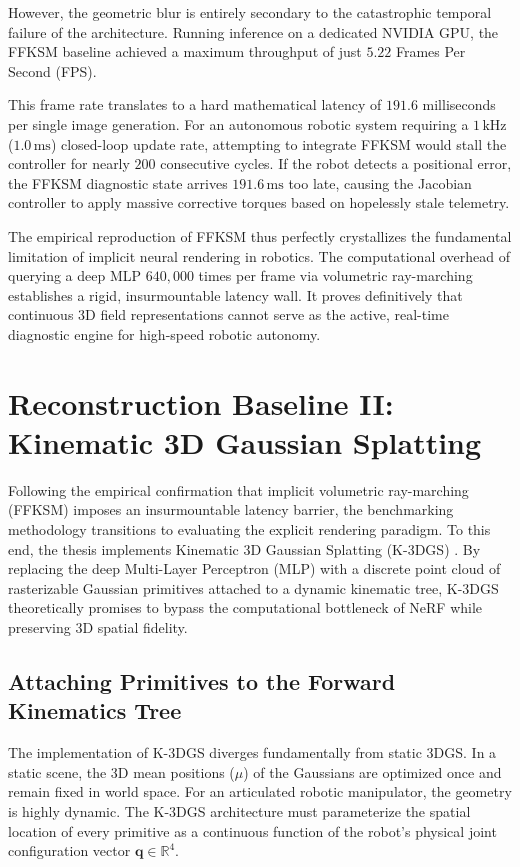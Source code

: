 \documentclass[12pt,a4paper,oneside]{report}
\begin{document}
However, the geometric blur is entirely secondary to the catastrophic temporal failure of the architecture. Running inference on a dedicated NVIDIA GPU, the FFKSM baseline achieved a maximum throughput of just $5.22$ Frames Per Second (FPS). 

This frame rate translates to a hard mathematical latency of $191.6$ milliseconds per single image generation. For an autonomous robotic system requiring a $1\,\mathrm{kHz}$ ($1.0\,\mathrm{ms}$) closed-loop update rate, attempting to integrate FFKSM would stall the controller for nearly $200$ consecutive cycles. If the robot detects a positional error, the FFKSM diagnostic state arrives $191.6\,\mathrm{ms}$ too late, causing the Jacobian controller to apply massive corrective torques based on hopelessly stale telemetry. 

The empirical reproduction of FFKSM thus perfectly crystallizes the fundamental limitation of implicit neural rendering in robotics. The computational overhead of querying a deep MLP $640,000$ times per frame via volumetric ray-marching establishes a rigid, insurmountable latency wall. It proves definitively that continuous 3D field representations cannot serve as the active, real-time diagnostic engine for high-speed robotic autonomy.

\section{Reconstruction Baseline II: Kinematic 3D Gaussian Splatting}

Following the empirical confirmation that implicit volumetric ray-marching (FFKSM) imposes an insurmountable latency barrier, the benchmarking methodology transitions to evaluating the explicit rendering paradigm. To this end, the thesis implements Kinematic 3D Gaussian Splatting (K-3DGS) \cite{hu2025learning}. By replacing the deep Multi-Layer Perceptron (MLP) with a discrete point cloud of rasterizable Gaussian primitives attached to a dynamic kinematic tree, K-3DGS theoretically promises to bypass the computational bottleneck of NeRF while preserving 3D spatial fidelity.

\subsection{Attaching Primitives to the Forward Kinematics Tree}

The implementation of K-3DGS diverges fundamentally from static 3DGS. In a static scene, the 3D mean positions ($\mu$) of the Gaussians are optimized once and remain fixed in world space. For an articulated robotic manipulator, the geometry is highly dynamic. The K-3DGS architecture must parameterize the spatial location of every primitive as a continuous function of the robot's physical joint configuration vector $\mathbf{q} \in \mathbb{R}^4$.
\end{document}
